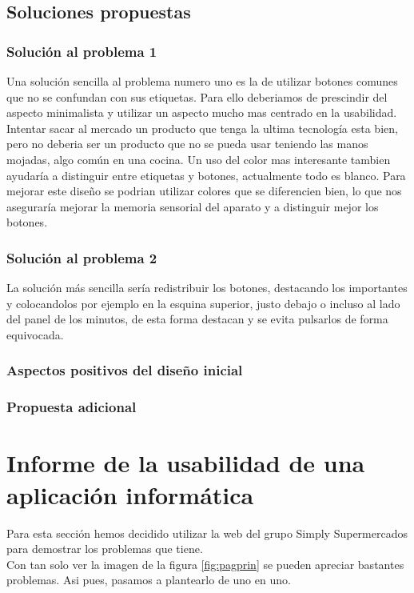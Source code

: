 \documentclass[a4paper,11pt]{article}
\begin{document}
\subsection{Soluciones propuestas}
\subsubsection{Solución al problema 1}
Una solución sencilla al problema numero uno es la de utilizar botones comunes que no se confundan con sus etiquetas. Para ello deberiamos de prescindir del aspecto minimalista y utilizar un aspecto mucho mas centrado en la usabilidad. Intentar sacar al mercado un producto que tenga la ultima tecnología esta bien, pero no deberia ser un producto que no se pueda usar teniendo las manos mojadas, algo común en una cocina.
Un uso del color mas interesante tambien ayudaría a distinguir entre etiquetas y botones, actualmente todo es blanco. Para mejorar este diseño se podrian utilizar colores que se diferencien bien, lo que nos aseguraría mejorar la memoria sensorial \cite{diapTema1} del aparato y a distinguir mejor los botones.

\subsubsection{Solución al problema 2}
La solución más sencilla sería redistribuir los botones, destacando los importantes y colocandolos por ejemplo en la esquina superior, justo debajo o incluso al lado del panel de los minutos, de esta forma destacan y se evita pulsarlos de forma equivocada.


\subsubsection{Aspectos positivos del diseño inicial}
\subsubsection{Propuesta adicional}



\section{Informe de la usabilidad de una aplicación informática}
Para esta sección hemos decidido utilizar la web del grupo Simply Supermercados \cite{webSimply} para demostrar los problemas que tiene.\\
Con tan solo ver la imagen de la figura \ref{fig:pagprin} se pueden apreciar bastantes problemas. Asi pues, pasamos a plantearlo de uno en uno.
\end{document}
